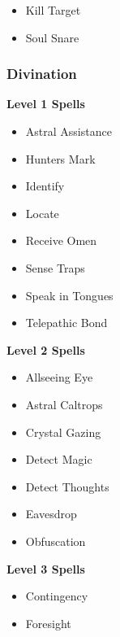 \begin{multicols}{4}
\begin{itemize}[itemsep=0em]
\item Kill Target

\item Soul Snare


\end{itemize}
\vfill\null
\columnbreak\subsubsection{Divination}
\textbf{Level 1 Spells}
\begin{itemize}[itemsep=0em]
\renewcommand\labelitemi{-}
\item Astral Assistance

\item Hunter\apos{}s Mark

\item Identify

\item Locate

\item Receive Omen

\item Sense Traps

\item Speak in Tongues

\item Telepathic Bond


\end{itemize}
\textbf{Level 2 Spells}
\begin{itemize}[itemsep=0em]
\renewcommand\labelitemi{-}
\item All\minus{}seeing Eye

\item Astral Caltrops

\item Crystal Gazing

\item Detect Magic

\item Detect Thoughts

\item Eavesdrop

\item Obfuscation


\end{itemize}
\textbf{Level 3 Spells}
\begin{itemize}[itemsep=0em]
\renewcommand\labelitemi{-}
\item Contingency

\item Foresight


\end{itemize}
\end{multicols}
